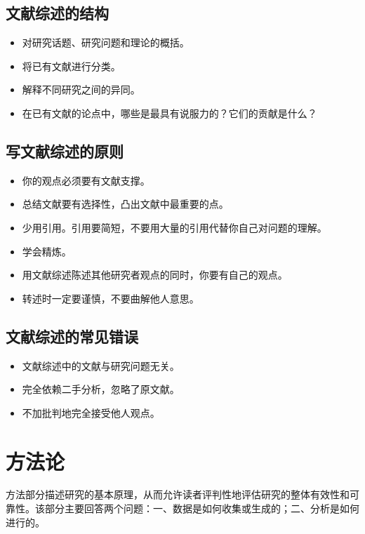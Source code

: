 \documentclass[cn,hazy,blue,14pt,screen]{elegantnote} %
\begin{document}
\subsection{文献综述的结构}

\begin{itemize}
  \item 对研究话题、研究问题和理论的概括。
  \item 将已有文献进行分类。
  \item 解释不同研究之间的异同。
  \item 在已有文献的论点中，哪些是最具有说服力的？它们的贡献是什么？
\end{itemize}

\subsection{写文献综述的原则}

\begin{itemize}
  \item 你的观点必须要有文献支撑。
  \item 总结文献要有选择性，凸出文献中最重要的点。
  \item 少用引用。引用要简短，不要用大量的引用代替你自己对问题的理解。
  \item 学会精炼。
  \item 用文献综述陈述其他研究者观点的同时，你要有自己的观点。
  \item 转述时一定要谨慎，不要曲解他人意思。
\end{itemize}

\subsection{文献综述的常见错误}

\begin{itemize}
  \item 文献综述中的文献与研究问题无关。
  \item 完全依赖二手分析，忽略了原文献。
  \item 不加批判地完全接受他人观点。
\end{itemize}

\newpage

\section{方法论}

方法部分描述研究的基本原理，从而允许读者评判性地评估研究的整体有效性和可靠性。该部分主要回答两个问题：一、数据是如何收集或生成的；二、分析是如何进行的。
\end{document}
